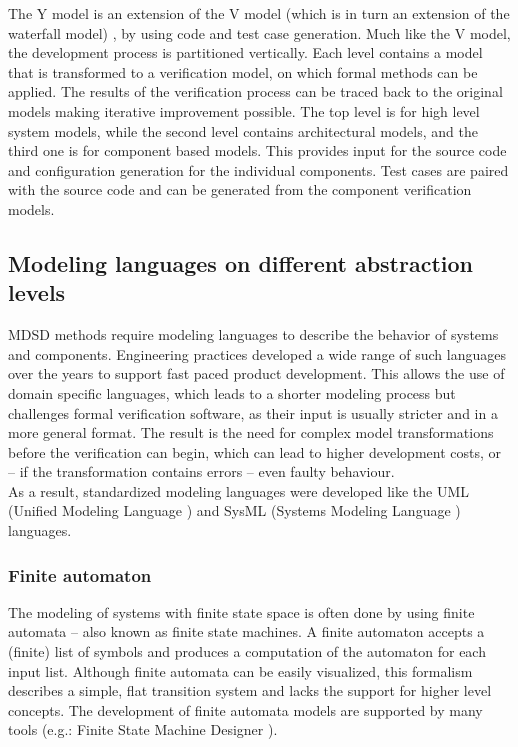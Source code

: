 The Y model \citep{ymodel} is an extension of the V model (which is in turn an extension of the waterfall model) \citep{randomwikipedialink3}, by using code and test case generation. Much like the V model, the development process is partitioned vertically. Each level contains a model that is transformed to a verification model, on which formal methods can be applied. The results of the verification process can be traced back to the original models making iterative improvement possible. The top level is for high level system models, while the second level contains architectural models, and the third one is for component based models. This provides input for the source code and configuration generation for the individual components. Test cases are paired with the source code and can be generated from the component verification models.

\subsection{Modeling languages on different abstraction levels}

MDSD methods require modeling languages to describe the behavior of systems and components. Engineering practices developed a wide range of such languages over the years to support fast paced product development. This allows the use of domain specific languages, which leads to a shorter modeling process but challenges formal verification software, as their input is usually stricter and in a more general format. The result is the need for complex model transformations before the verification can begin, which can lead to higher development costs, or -- if the transformation contains errors -- even faulty behaviour.\\
As a result, standardized modeling languages were developed like the UML (Unified Modeling Language \citep{uml}) and SysML (Systems Modeling Language \citep{sysml}) languages.

\subsubsection{Finite automaton}

The modeling of systems with finite state space is often done by using finite automata -- also known as finite state machines. A finite automaton accepts a (finite) list of symbols and produces a computation of the automaton for each input list.
Although finite automata can be easily visualized, this formalism describes a simple, flat transition system and lacks the support for higher level concepts. The development of finite automata models  are supported by many tools (e.g.: Finite State Machine Designer \citep{fsmd}).

